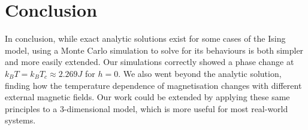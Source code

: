 \documentclass[11pt]{article}
\begin{document}
	\section{Conclusion}
  
	In conclusion, while exact analytic solutions exist for some cases of the Ising model, using a Monte Carlo simulation to solve for its behaviours is both simpler and more easily extended. Our simulations correctly showed a phase change at $k_B T = k_BT_c \approx 2.269 J$ for $h=0$. We also went beyond the analytic solution, finding how the temperature dependence of magnetisation changes with different external magnetic fields. Our work could be extended by applying these same principles to a 3-dimensional model, which is more useful for most real-world systems.
	
	 
\end{document}
